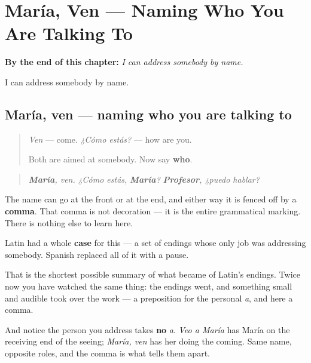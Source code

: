 
\chapter{María, Ven --- Naming Who You Are Talking To}
\label{ch:maria-ven}

\begin{chapteropening}
\textbf{By the end of this chapter:} \emph{I can address somebody by name.}

I can address somebody by name.
\end{chapteropening}

\section[María, ven]{María, ven — naming who you are talking to}

\label{lesson:ES-C64-maria-ven}



\begin{quote}
\emph{Ven} — come. \emph{¿Cómo estás?} — how are you.

Both are aimed at somebody. Now say \textbf{who}.
\end{quote}

\begin{grammarlens}[title={Grammar Lens: the comma is the grammar}]
\begin{quote}
\emph{\textbf{María}}\emph{, ven.} \emph{¿Cómo estás,} \emph{\textbf{María}}\emph{?} \emph{\textbf{Profesor}}\emph{, ¿puedo hablar?}
\end{quote}

The name can go at the front or at the end, and either way it is fenced off by a \textbf{comma}. That comma is not decoration — it is the entire grammatical marking. There is nothing else to learn here.
\end{grammarlens}

\begin{culture}
Latin had a whole \textbf{case} for this — a set of endings whose only job was addressing somebody. Spanish replaced all of it with a pause.

That is the shortest possible summary of what became of Latin's endings. Twice now you have watched the same thing: the endings went, and something small and audible took over the work — a preposition for the personal \emph{a}, and here a comma.

And notice the person you address takes \textbf{no} \emph{a}. \emph{Veo a María} has María on the receiving end of the seeing; \emph{María, ven} has her doing the coming. Same name, opposite roles, and the comma is what tells them apart.
\end{culture}


